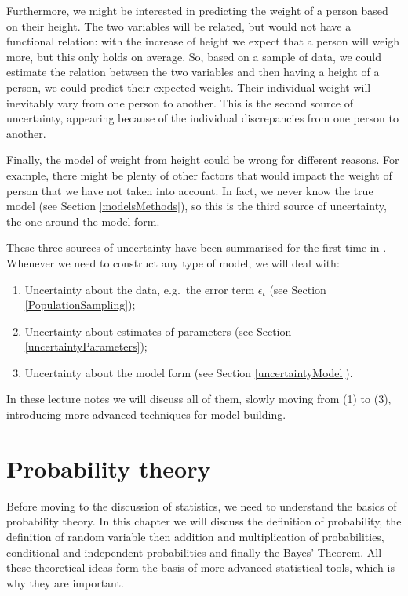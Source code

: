 \documentclass[
]{book}
\providecommand{\tightlist}{%
  \setlength{\itemsep}{0pt}\setlength{\parskip}{0pt}}
\theoremstyle{definition}
\theoremstyle{definition}
\theoremstyle{definition}
\theoremstyle{definition}
\theoremstyle{remark}
\begin{document}
Furthermore, we might be interested in predicting the weight of a person based on their height. The two variables will be related, but would not have a functional relation: with the increase of height we expect that a person will weigh more, but this only holds on average. So, based on a sample of data, we could estimate the relation between the two variables and then having a height of a person, we could predict their expected weight. Their individual weight will inevitably vary from one person to another. This is the second source of uncertainty, appearing because of the individual discrepancies from one person to another.

Finally, the model of weight from height could be wrong for different reasons. For example, there might be plenty of other factors that would impact the weight of person that we have not taken into account. In fact, we never know the true model (see Section \ref{modelsMethods}), so this is the third source of uncertainty, the one around the model form.

These three sources of uncertainty have been summarised for the first time in \citet{Chatfield1996}. Whenever we need to construct any type of model, we will deal with:

\begin{enumerate}
\def\labelenumi{\arabic{enumi}.}
\tightlist
\item
  Uncertainty about the data, e.g.~the error term \(\epsilon_t\) (see Section \ref{PopulationSampling});
\item
  Uncertainty about estimates of parameters (see Section \ref{uncertaintyParameters});
\item
  Uncertainty about the model form (see Section \ref{uncertaintyModel}).
\end{enumerate}

In these lecture notes we will discuss all of them, slowly moving from (1) to (3), introducing more advanced techniques for model building.

\hypertarget{probabilityTheory}{%
\chapter{Probability theory}\label{probabilityTheory}}

Before moving to the discussion of statistics, we need to understand the basics of probability theory. In this chapter we will discuss the definition of probability, the definition of random variable then addition and multiplication of probabilities, conditional and independent probabilities and finally the Bayes' Theorem. All these theoretical ideas form the basis of more advanced statistical tools, which is why they are important.
\end{document}

